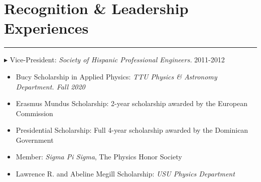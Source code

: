 \documentclass[letterpaper,10pt]{article}
\begin{document}
\section*{Recognition \& Leadership Experiences }       

\hrule
\vspace{.3 cm}

$\blacktriangleright$  Vice-President: \emph{Society of Hispanic Professional Engineers.} 2011-2012\\

\begin{itemize}[label=$\blacktriangleright$]

\item Bucy Scholarship in Applied Physics: \emph{TTU Physics \& Astronomy Department. Fall 2020} \\  %

\end{itemize}

\begin{itemize}[label=$\blacktriangleright$]

  \item Erasmus Mundus Scholarship: 2-year scholarship awarded by the European Commission  \\
\item Presidential Scholarship: Full 4-year scholarship awarded by the Dominican Government \\    
\end{itemize}

\begin{itemize}[label=$\blacktriangleright$]

\item  Member: \emph{Sigma Pi Sigma}, The Physics Honor Society  \\   
\end{itemize}

\begin{itemize}[label=$\blacktriangleright$]

\item Lawrence  R. and Abeline Megill Scholarship: \emph{USU Physics Department}   %
  \end{itemize}
\end{document}
